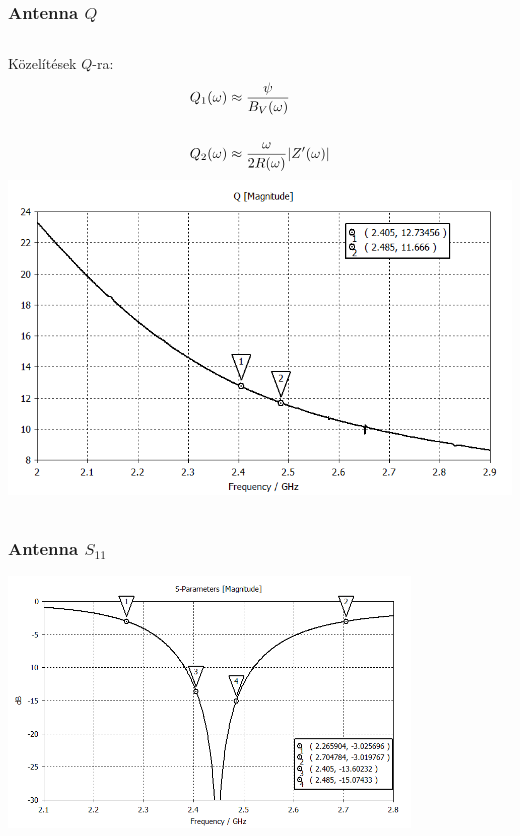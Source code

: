 \documentclass[aspectratio=43]{beamer}
\begin{document}
\begin{frame}
	\frametitle{Antenna $Q$}
	\begin{columns}
			Közelítések $Q$-ra:\\
			\begin{align*}
				Q_1(\omega) & \approx \frac{\psi}{B_{V}(\omega)} \\
				\vspace{2cm}\\
				Q_2(\omega) & \approx \frac{\omega}{2 R(\omega)}|Z'(\omega)|
			\end{align*}
			\includegraphics[width=\textwidth]{bifa_broadband_QZ.png}
	\end{columns}
\end{frame}
\begin{frame}
	\frametitle{Antenna $S_{11}$}
		\centering
		\includegraphics[width=0.8\textwidth]{bifa_broadband_S11_dB.png}
\end{frame}
\end{document}

